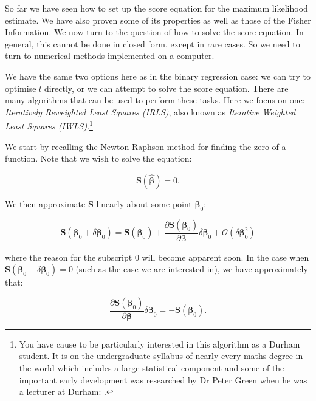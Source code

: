 \documentclass[
  12pt,
]{book}
\begin{document}
So far we have seen how to set up the score equation for the maximum likelihood estimate. We have also proven some of its properties as well as those of the Fisher Information. We now turn to the question of how to solve the score equation. In general, this cannot be done in closed form, except in rare cases. So we need to turn to numerical methods implemented on a computer.

We have the same two options here as in the binary regression case: we can try to optimise \(l\) directly, or we can attempt to solve the score equation. There are many algorithms that can be used to perform these tasks. Here we focus on one: \emph{Iteratively Reweighted Least Squares (IRLS)}, also known as \emph{Iterative Weighted Least Squares (IWLS)}.\footnote{You have cause to be particularly interested in this algorithm as a Durham student. It is on the undergraduate syllabus of nearly every maths degree in the world which includes a large statistical component and some of the important early development was researched by Dr Peter Green when he was a lecturer at Durham: \citet{green1984irl}.}

We start by recalling the Newton-Raphson method for finding the zero of a function. Note that we wish to solve the equation:

\begin{equation}
  \boldsymbol{S}(\hat{\boldsymbol{\beta}}) = 0.
\end{equation}

We then approximate \(\boldsymbol{S}\) linearly about some point \(\boldsymbol{\beta}_{0}\):

\begin{equation}
  \boldsymbol{S}(\boldsymbol{\beta}_{0} + \delta\boldsymbol{\beta}_{0})
  = \boldsymbol{S}(\boldsymbol{\beta}_{0}) + 
    \frac{\partial \boldsymbol{S}(\boldsymbol{\beta}_{0})}{\partial\boldsymbol{\beta}}\delta\boldsymbol{\beta}_{0} + 
    \mathcal{O}(\delta\boldsymbol{\beta}_{0}^{2})
\end{equation}

where the reason for the subscript \(0\) will become apparent soon. In the case when \(\boldsymbol{S}(\boldsymbol{\beta}_{0} + \delta\boldsymbol{\beta}_{0}) = 0\) (such as the case we are interested in), we have approximately that:

\begin{equation}
  \frac{\partial \boldsymbol{S}(\boldsymbol{\beta}_{0})}{\partial\boldsymbol{\beta}}\delta\boldsymbol{\beta}_{0}
  = - \boldsymbol{S}(\boldsymbol{\beta}_{0}).
  \label{eq:solutionnewton}
\end{equation}
\end{document}
